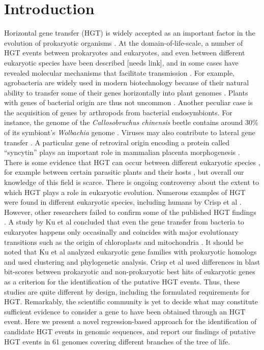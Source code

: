 \section{Introduction}
\label{intro}
Horizontal gene transfer (HGT) is widely accepted as an important factor in the
evolution of prokaryotic organisms \cite{Ochman2000}. At the
domain-of-life-scale, a number of HGT events between prokaryotes and
eukaryotes, and even between different eukaryotic species have been described
[needs link], and in some cases have revealed molecular mechanisms that
facilitate transmission \cite{Soucy2015}. For example, agrobacteria are widely
used in modern biotechnology because of their natural ability to transfer some
of their genes horizontally into plant genomes \cite{Chilton1977}. Plants with
genes of bacterial origin are thus not uncommon \cite{Kyndt2015, Matveeva2012,
Matveeva2014}. Another peculiar case is the acquisition of genes by arthropods
from bacterial endosymbionts. For instance, the genome of the
\textit{Callosobruchus chinensis} beetle contains around 30\% of its symbiont's
\textit{Wolbachia} genome \cite{Nikoh2008}. Viruses may also contribute to
lateral gene transfer \cite{Drezen2017}. A particular gene of retroviral origin
encoding a protein called ``syncytin'' plays an important role in mammalian
placenta morphogenesis \cite{Mi2000}. There is some evidence that HGT can occur
between different eukaryotic species \cite{Soucy2015}, for example between
certain parasitic plants and their hosts
\cite{Yoshida2010, Xi2012, Zhang2013, Zhang2014}, but overall our knowledge of
this field is scarce. There is ongoing controversy about the extent to which
HGT plays a role in eukaryotic evolution. Numerous examples of HGT were found
in different eukaryotic species, including humans by Crisp et al
\cite{Crisp2015}. However, other researchers failed to confirm some of the
published HGT findings \cite{Salzberg2017}. A study by Ku et al concluded that
even the gene transfer from bacteria to eukaryotes happens only occasinally and
coincides with major evolutionary transitions such as the origin of
chloroplasts and mitochondria \cite{Ku2015}. It should be noted that Ku et al
analyzed eukaryotic gene families with prokaryotic homologs and used clustering
and phylogenetic analysis. Crisp et al used differences in blast bit-scores
between prokaryotic and non-prokaryotic best hits of eukaryotic genes as a
criterion for the identification of the putative HGT events. Thus, these
studies are quite different by design, including the formulated requirements
for HGT. Remarkably, the scientific community is yet to decide what may
constitute sufficient evidence to consider a gene to have been obtained through
an HGT event. Here we present a novel regression-based approach for the
identification of candidate HGT events in genomic sequences, and report our
findings of putative HGT events in 61 genomes covering different branches of
the tree of life.
